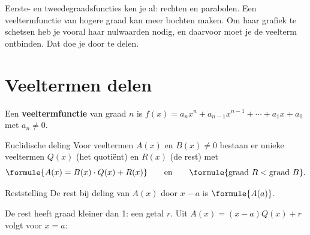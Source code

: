 %



Eerste- en tweedegraadsfuncties ken je al: rechten en parabolen. Een veeltermfunctie van hogere graad kan meer bochten maken. Om haar grafiek te schetsen heb je vooral haar nulwaarden nodig, en daarvoor moet je de veelterm ontbinden. Dat doe je door te delen.

\begin{oefeningen}[Start]

\end{oefeningen}

\section{Veeltermen delen}

\begin{theorie}
Een \textbf{\textcolor{accent}{veeltermfunctie}} van graad $n$ is $f(x) = a_n x^n + a_{n-1}x^{n-1} + \cdots + a_1 x + a_0$ met $a_n \neq 0$.

\begin{stelling}{Euclidische deling}
Voor veeltermen $A(x)$ en $B(x) \neq 0$ bestaan er unieke veeltermen $Q(x)$ (het quotiënt) en $R(x)$ (de rest) met
\[\formule{A(x) = B(x) \cdot Q(x) + R(x)} \qquad \text{en} \qquad \formule{\text{graad } R < \text{graad } B}.\]
\end{stelling}
\begin{stelling}{Reststelling}
De rest bij deling van $A(x)$ door $x - a$ is $\formule{A(a)}$.
\end{stelling}
\begin{bewijs}
De rest heeft graad kleiner dan 1: een getal $r$. Uit $A(x) = (x - a)Q(x) + r$ volgt voor $x = a$:
\end{bewijs}
\end{theorie}

